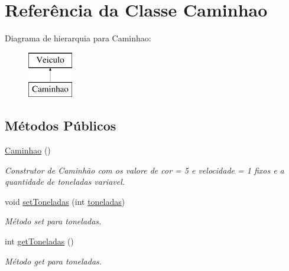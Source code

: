 \hypertarget{class_caminhao}{}\section{Referência da Classe Caminhao}
\label{class_caminhao}
Diagrama de hierarquia para Caminhao\+:\begin{figure}[H]
\begin{center}
\leavevmode
\includegraphics[height=2.000000cm]{class_caminhao}
\end{center}
\end{figure}
\subsection*{Métodos Públicos}
\begin{DoxyCompactItemize}
\item 
\mbox{\label{class_caminhao_af533c39b3db0b14e7c404d4d91a88e47}} 
\mbox{\hyperlink{class_caminhao_af533c39b3db0b14e7c404d4d91a88e47}{Caminhao}} ()
\begin{DoxyCompactList}\small\item\em Construtor de Caminhão com os valore de cor = 5 e velocidade = 1 fixos e a quantidade de toneladas variavel. \end{DoxyCompactList}\item 
\mbox{\label{class_caminhao_a800cde90f61df345439b90e78552b026}} 
void \mbox{\hyperlink{class_caminhao_a800cde90f61df345439b90e78552b026}{set\+Toneladas}} (int \mbox{\hyperlink{class_caminhao_a76b6b066d32dac55e7b6e6669162b94e}{toneladas}})
\begin{DoxyCompactList}\small\item\em Método set para toneladas. \end{DoxyCompactList}\item 
\mbox{\label{class_caminhao_a0d70fd366dda14b15b69fea764055001}} 
int \mbox{\hyperlink{class_caminhao_a0d70fd366dda14b15b69fea764055001}{get\+Toneladas}} ()
\begin{DoxyCompactList}\small\item\em Método get para toneladas. \end{DoxyCompactList}\end{DoxyCompactItemize}
